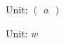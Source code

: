 \documentclass{ctexart}
\begin{document}
Unit: $ \begin{pmatrix}a\end{pmatrix}$

Unit: $ w$
\end{document}
